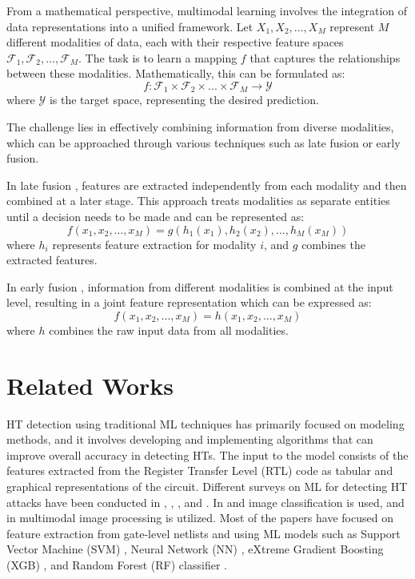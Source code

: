 From a mathematical perspective, multimodal learning involves the integration of data representations into a unified framework. Let \(X_1, X_2, ..., X_M\) represent \(M\) different modalities of data, each with their respective feature spaces \(\mathcal{F}_1, \mathcal{F}_2, ..., \mathcal{F}_M\). The task is to learn a mapping \(f\) that captures the relationships between these modalities. Mathematically, this can be formulated as:
\begin{equation}
f: \mathcal{F}_1 \times \mathcal{F}_2 \times ... \times \mathcal{F}_M \rightarrow \mathcal{Y}
\end{equation}
where \(\mathcal{Y}\) is the target space, representing the desired prediction.

The challenge lies in effectively combining information from diverse modalities, which can be approached through various techniques such as late fusion or early fusion. 

In late fusion \cite{trong2020late}, features are extracted independently from each modality and then combined at a later stage. This approach treats modalities as separate entities until a decision needs to be made and can be represented as:
\begin{equation}
f(x_1, x_2, ..., x_M) = g(h_1(x_1), h_2(x_2), ..., h_M(x_M))
\end{equation}
where \(h_i\) represents feature extraction for modality \(i\), and \(g\) combines the extracted features.

In early fusion \cite{nguyen2021gefa}, information from different modalities is combined at the input level, resulting in a joint feature representation which can be expressed as:
\begin{equation}
f(x_1, x_2, ..., x_M) = h(x_1, x_2, ..., x_M)
\end{equation}
where \(h\) combines the raw input data from all modalities.

\section*{Related Works}
\label{Related}
HT detection using traditional ML techniques has primarily focused on modeling methods, and it involves developing and implementing algorithms that can improve overall accuracy in detecting HTs. The input to the model consists of the features extracted from the Register Transfer Level (RTL) code as tabular and graphical representations of the circuit. Different surveys on ML for detecting HT attacks have been conducted in \cite{huang2020survey}, \cite{gubbi2023hardware}, \cite{koylu2023survey}, and \cite{kundu2021application}. In \cite{botero2021hardware} and \cite{ashok2022hardware} image classification is used, and in \cite{10027082} multimodal image processing is utilized. Most of the papers have focused on feature extraction from gate-level netlists and using ML models such as Support Vector Machine (SVM) \cite{bao2014application}, Neural Network (NN) \cite{hasegawa2017hardware}, eXtreme Gradient Boosting (XGB) \cite{dong2019machine}, and Random Forest (RF) classifier \cite{hasegawa2017trojan}.

